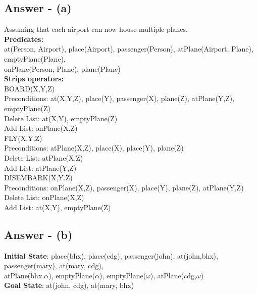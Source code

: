 \documentclass{article}
\begin{document}
\subsection{Answer - (a)}
Assuming that each airport can now house multiple planes. \\
\newline
\textbf{Predicates: }\\
\newline
at(Person, Airport), place(Airport), passenger(Person),
atPlane(Airport, Plane), emptyPlane(Plane), \\
onPlane(Person, Plane), plane(Plane) \\
\newline
\textbf{Strips operators: }\\
\newline
BOARD(X,Y,Z) \\
\-\hspace{10mm} Preconditions: at(X,Y,Z), place(Y), passenger(X), plane(Z), atPlane(Y,Z), emptyPlane(Z) \\
\-\hspace{10mm} Delete List: at(X,Y), emptyPlane(Z) \\
\-\hspace{10mm} Add List: onPlane(X,Z) \\
\newline
FLY(X,Y,Z) \\
\-\hspace{10mm} Preconditions: atPlane(X,Z), place(X), place(Y), plane(Z)\\
\-\hspace{10mm} Delete List: atPlane(X,Z) \\
\-\hspace{10mm} Add List: atPlane(Y,Z) \\
\newline
DISEMBARK(X,Y.Z) \\
\-\hspace{10mm} Preconditions: onPlane(X,Z), passenger(X), place(Y), plane(Z), atPlane(Y,Z) \\
\-\hspace{10mm} Delete List: onPlane(X,Z) \\
\-\hspace{10mm} Add List: at(X,Y), emptyPlane(Z) \\
\newline
\subsection{Answer - (b)}
\textbf{Initial State}: place(bhx),
place(cdg), passenger(john), at(john,bhx), passenger(mary), at(mary, cdg), \\
atPlane(bhx.$\alpha$), emptyPlane($\alpha$), emptyPlane($\omega$), atPlane(cdg,$\omega$) \\
\newline 
\textbf{Goal State}: at(john, cdg), at(mary, bhx)
\end{document}
